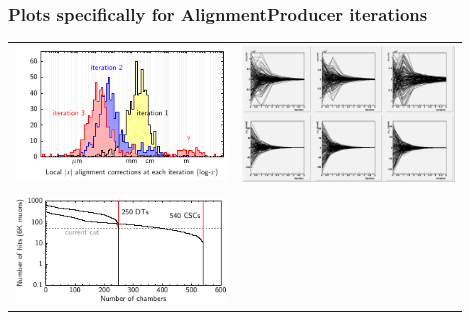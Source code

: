 \documentclass[compress]{beamer}
\begin{document}
\begin{frame}
\frametitle{Plots specifically for AlignmentProducer iterations}

\begin{tabular}{p{0.45\linewidth} p{0.45\linewidth}}
\begin{minipage}{\linewidth}
\includegraphics[width=\linewidth]{three_iterations_really}
\end{minipage} &
\begin{minipage}{\linewidth}
\includegraphics[width=\linewidth]{shifts_vs_iter_survey.png}
\end{minipage} \\ & \\
\begin{minipage}{\linewidth}
\includegraphics[width=\linewidth]{coverage}

\end{minipage}
\end{tabular}
\end{frame}
\end{document}
